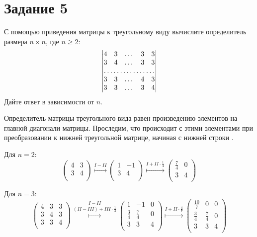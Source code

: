 \documentclass[a4paper,12pt]{article}
\begin{document}
\section*{Задание 5}
С помощью приведения матрицы к треугольному виду вычислите определитель размера $n \times n$, где $n \geqslant 2$:
\[
\begin{vmatrix}
4 & 3 & \dots & 3 & 3\\
3 & 4 & \dots & 3 & 3\\
\hdotsfor{5}\\
3 & 3 & \dots & 4 & 3\\
3 & 3 & \dots & 3 & 4
\end{vmatrix}
\]
Дайте ответ в зависимости от $n$. \par
{}
Определитель матрицы треугольного вида равен произведению элементов на главной диагонали матрицы. Проследим, что происходит с этими элементами при преобразовании к нижней треугольной матрице, начиная с нижней строки .\par
Для $n=2$:
$$
\begin{pmatrix}
4 & 3\\
3 & 4\\
\end{pmatrix}
\overset{I-II}{\longmapsto}
\begin{pmatrix}
1 & -1\\
3 & 4\\
\end{pmatrix}
\overset{I+II \cdot \frac{1}{4}}{\longmapsto}
\begin{pmatrix}
\frac{7}{4} & 0\\
3 & 4\\
\end{pmatrix}
$$
\par
Для $n=3$:
$$
\begin{pmatrix}
4 & 3 & 3\\
3 & 4 & 3\\
3 & 3 & 4\\
\end{pmatrix}
\overset{I-II}{\overset{(II-III) + III \cdot \frac{1}{4}}{\longmapsto}}
\begin{pmatrix}
1 & -1 & 0\\
\frac{3}{4} & \frac{7}{4} & 0 \\
3 & 3 & 4\\
\end{pmatrix}
\overset{I+II \cdot \frac{4}{7}}{\longmapsto}
\begin{pmatrix}
\frac{10}{7} & 0 & 0\\
\frac{3}{4} & \frac{7}{4} & 0 \\
3 & 3 & 4\\
\end{pmatrix}
$$
\end{document}
